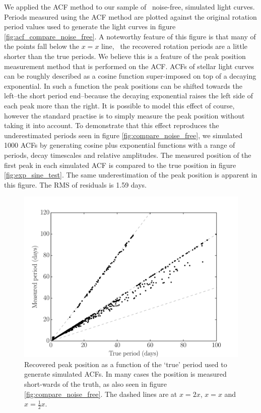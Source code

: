 We applied the ACF method to our sample of \nlightcurves\ noise-free,
simulated light curves.
Periods measured using the ACF method are plotted against the original
rotation period values used to generate the light curves in figure
\ref{fig:acf_compare_noise_free}.
A noteworthy feature of this figure is that many of the points fall below the
$x=x$ line, \ie\ the recovered rotation periods are a little shorter than the
true periods.
We believe this is a feature of the peak position measurement method that is
performed on the ACF.
ACFs of stellar light curves can be roughly described as a cosine function
super-imposed on top of a decaying exponential.
In such a function the peak positions can be shifted towards the left--the
short period end--because the decaying exponential raises the left side of
each peak more than the right.
It is possible to model this effect of course, however the standard practise
is to simply measure the peak position without taking it into account.
To demonstrate that this effect reproduces the underestimated periods seen in
figure \ref{fig:compare_noise_free}, we simulated 1000 ACFs by generating
cosine plus exponential functions with a range of periods, decay timescales
and relative amplitudes.
The measured position of the first peak in each simulated ACF is compared to
the true position in figure \ref{fig:exp_sine_test}.
The same underestimation of the peak position is apparent in this figure.
The RMS of residuals is 1.59 days.

\begin{figure}
\begin{center}
\includegraphics[width=6in, clip=true]{figures/exp_sine_test.pdf}
\caption[A flaw in the ACF method.]
{Recovered peak position as a function of the `true' period used to
generate simulated ACFs. In many cases the position is measured short-wards of
the truth, as also seen in figure \ref{fig:compare_noise_free}. The dashed
lines are at $x=2x$, $x=x$ and $x=\frac{1}{2}x$.}
\end{center}
\end{figure}
\label{fig:exp_sine_test}

